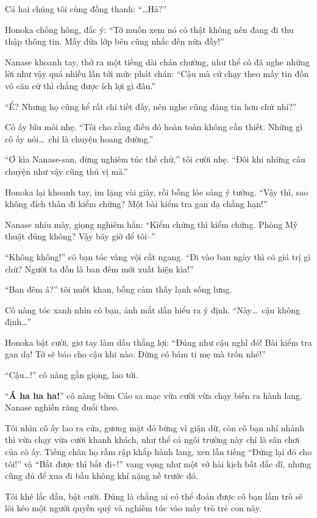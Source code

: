 \documentclass[../main.tex]{subfiles}
\begin{document}
Cả hai chúng tôi cùng đồng thanh: ``\dots Hả?''

Honoka chống hông, đắc ý: ``Tớ muốn xem nó có thật không nên đang đi thu thập thông tin. Mấy đứa lớp bên cũng nhắc đến nữa đấy!''

Nanase khoanh tay, thở ra một tiếng dài chán chường, như thể cô đã nghe những lời như vậy quá nhiều lần tới mức phát chán: ``Cậu mà cứ chạy theo mấy tin đồn vô căn cứ thì chẳng được ích lợi gì đâu.''

``Ể? Nhưng họ cũng kể rất chi tiết đấy, nên nghe cũng đáng tin hơn chứ nhỉ?''

Cô ấy bĩu môi nhẹ. ``Tôi cho rằng điều đó hoàn toàn không cần thiết. Những gì cô ấy nói\dots\ chỉ là chuyện hoang đường.''

``Ơ kìa Nanase-san, đừng nghiêm túc thế chứ,'' tôi cười nhẹ. ``Đôi khi những câu chuyện như vậy cũng thú vị mà.''

Honoka lại khoanh tay, im lặng vài giây, rồi bỗng lóe sáng ý tưởng. ``Vậy thì, sao không đích thân đi kiểm chứng? Một bài kiểm tra gan dạ chẳng hạn!''

Nanase nhíu mày, giọng nghiêm hẳn: ``Kiểm chứng thì kiểm chứng. Phòng Mỹ thuật đúng không? Vậy bây giờ để tôi--''

``Không không!'' cô bạn tóc vàng vội cắt ngang. ``Đi vào ban ngày thì có giá trị gì chứ? Người ta đồn là ban đêm mới xuất hiện kìa!''

``Ban đêm á?'' tôi nuốt khan, bỗng cảm thấy lạnh sống lưng.

Cô nàng tóc xanh nhìn cô bạn, ánh mắt dần hiểu ra ý định. ``Này\dots\ cậu không định\dots''

Honoka bật cười, giơ tay làm dấu thắng lợi: ``Đúng như cậu nghĩ đó! Bài kiểm tra gan dạ! Tớ sẽ báo cho cậu khi nào. Đừng có bám ti mẹ mà trốn nhé!''

``Cậu\dots!'' cô nàng gằn giọng, lao tới.

``\textbf{Á ha ha ha!}'' cô nàng bờm Cáo sa mạc vừa cười vừa chạy biến ra hành lang. Nanase nghiến răng đuổi theo.

Tôi nhìn cô ấy lao ra cửa, gương mặt đỏ bừng vì giận dữ, còn cô bạn nhí nhảnh thì vừa chạy vừa cười khanh khách, như thể cả ngôi trường này chỉ là sân chơi của cô ấy. Tiếng chân họ rầm rập khắp hành lang, xen lẫn tiếng ``Đứng lại đó cho tôi!'' và ``Bắt được thì bắt đi\~{}!'' vang vọng như một vở hài kịch bất đắc dĩ, nhưng cũng đủ để xua đi bầu không khí nặng nề trước đó.

Tôi khẽ lắc đầu, bật cười. Đúng là chẳng ai có thể đoán được cô bạn lắm trò sẽ lôi kéo một người quyền quý và nghiêm túc vào mấy trò trẻ con này.
\end{document}
